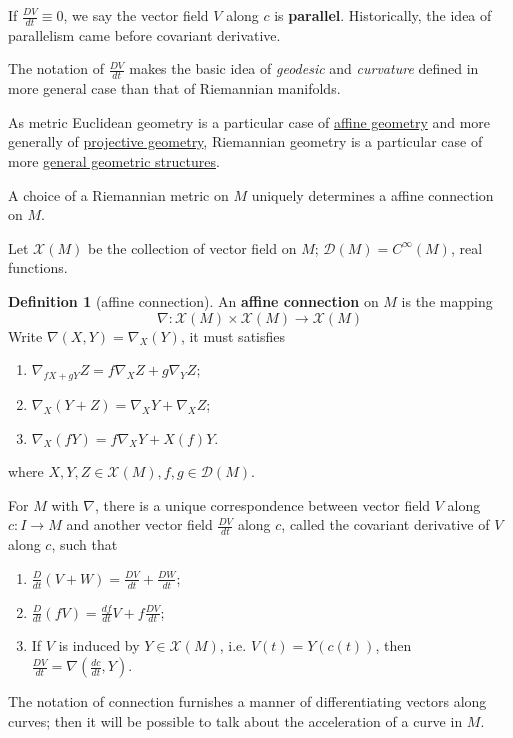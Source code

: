 \documentclass{amsart}
\theoremstyle{plain}
\theoremstyle{definition}
\newtheorem{definition}[theorem]{Definition}
\theoremstyle{remark}
\begin{document}
If $\frac{DV}{dt}\equiv0$, we say the vector field $V$ along $c$ is \textbf{parallel}. Historically, the idea of parallelism came before covariant derivative.

The notation of $\frac{DV}{dt}$ makes the basic idea of \textit{geodesic} and \textit{curvature} defined in more general case than that of Riemannian manifolds.

As metric Euclidean geometry is a particular case of \underline{affine geometry} and more generally of \underline{projective geometry}, Riemannian geometry is a particular case of more \underline{general geometric structures}.

A choice of a Riemannian metric on $M$ uniquely determines a affine connection on $M$.

Let $\mathcal{X}(M)$ be the collection of vector field on $M$; $\mathcal{D}(M)=C^{\infty}(M)$, real functions.

\begin{definition}[affine connection]
An \textbf{affine connection} on $M$ is the mapping
\[
\nabla:\mathcal{X}(M)\times \mathcal{X}(M)\to \mathcal{X}(M)
\]
Write $\nabla(X,Y)=\nabla_{X}(Y)$, it must satisfies
	\begin{enumerate}
		\item $\nabla _{fX+gY}Z=f\nabla_{X}Z+g\nabla_{Y}Z$;
		\item $\nabla_{X}(Y+Z)=\nabla_{X}Y+\nabla_{X}Z$;
		\item $\nabla_{X}(fY)=f\nabla_{X}Y+X(f)Y$.
	\end{enumerate}
where $X, Y, Z\in \mathcal{X}(M), f, g\in \mathcal{D}(M)$.
\end{definition}
For $M$ with $\nabla$, there is a unique correspondence between vector field $V$ along $c:I\to M$ and another vector field $\frac{DV}{dt }$ along $c$, called the covariant derivative of $V$ along $c$, such that

\begin{enumerate}
	\item $\frac{D}{dt }(V+W)=\frac{DV}{dt }+\frac{DW}{dt }$;
	\item $\frac{D}{dt }(fV)=\frac{df}{dt }V+f\frac{DV}{dt }$;
	\item If $V$ is induced by $Y\in \mathcal{X}(M)$, i.e. $V(t)=Y(c(t))$, then $\frac{DV}{dt }=\nabla\left( \frac{dc}{dt },Y \right)$.
\end{enumerate}

The notation of connection furnishes a manner of differentiating vectors along curves; then it will be possible to talk about the acceleration of a curve in $M$.
\end{document}
